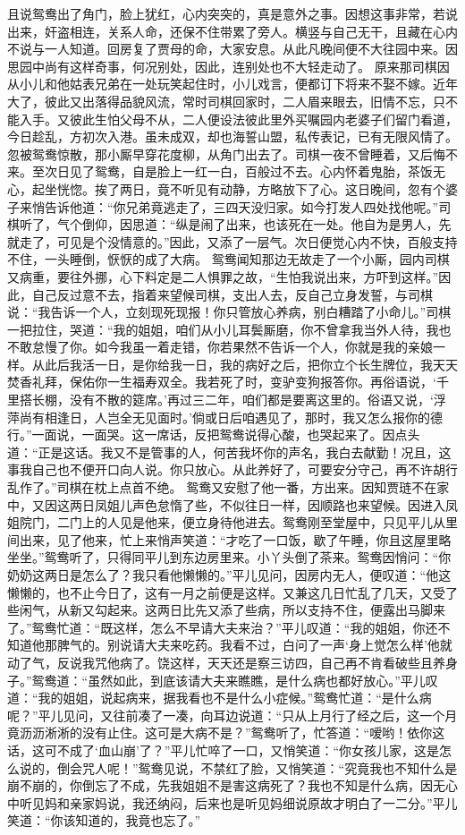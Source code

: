 \documentclass[12pt,oneside]{book}
\begin{document}
且说鸳鸯出了角门，脸上犹红，心内突突的，真是意外之事。因想这事非常，若说出来，奸盗相连，关系人命，还保不住带累了旁人。横竖与自己无干，且藏在心内不说与一人知道。回房复了贾母的命，大家安息。从此凡晚间便不大往园中来。因思园中尚有这样奇事，何况别处，因此，连别处也不大轻走动了。
原来那司棋因从小儿和他姑表兄弟在一处玩笑起住时，小儿戏言，便都订下将来不娶不嫁。近年大了，彼此又出落得品貌风流，常时司棋回家时，二人眉来眼去，旧情不忘，只不能入手。又彼此生怕父母不从，二人便设法彼此里外买嘱园内老婆子们留门看道，今日趁乱，方初次入港。虽未成双，却也海誓山盟，私传表记，已有无限风情了。忽被鸳鸯惊散，那小厮早穿花度柳，从角门出去了。司棋一夜不曾睡着，又后悔不来。至次日见了鸳鸯，自是脸上一红一白，百般过不去。心内怀着鬼胎，茶饭无心，起坐恍惚。挨了两日，竟不听见有动静，方略放下了心。这日晚间，忽有个婆子来悄告诉他道：“你兄弟竟逃走了，三四天没归家。如今打发人四处找他呢。”司棋听了，气个倒仰，因思道：“纵是闹了出来，也该死在一处。他自为是男人，先就走了，可见是个没情意的。”因此，又添了一层气。次日便觉心内不快，百般支持不住，一头睡倒，恹恹的成了大病。
鸳鸯闻知那边无故走了一个小厮，园内司棋又病重，要往外挪，心下料定是二人惧罪之故，“生怕我说出来，方吓到这样。”因此，自己反过意不去，指着来望候司棋，支出人去，反自己立身发誓，与司棋说：“我告诉一个人，立刻现死现报！你只管放心养病，别白糟踏了小命儿。”司棋一把拉住，哭道：“我的姐姐，咱们从小儿耳鬓厮磨，你不曾拿我当外人待，我也不敢怠慢了你。如今我虽一着走错，你若果然不告诉一个人，你就是我的亲娘一样。从此后我活一日，是你给我一日，我的病好之后，把你立个长生牌位，我天天焚香礼拜，保佑你一生福寿双全。我若死了时，变驴变狗报答你。再俗语说，‘千里搭长棚，没有不散的筵席。’再过三二年，咱们都是要离这里的。俗语又说，‘浮萍尚有相逢日，人岂全无见面时。’倘或日后咱遇见了，那时，我又怎么报你的德行。”一面说，一面哭。这一席话，反把鸳鸯说得心酸，也哭起来了。因点头道：“正是这话。我又不是管事的人，何苦我坏你的声名，我白去献勤！况且，这事我自己也不便开口向人说。你只放心。从此养好了，可要安分守己，再不许胡行乱作了。”司棋在枕上点首不绝。
鸳鸯又安慰了他一番，方出来。因知贾琏不在家中，又因这两日凤姐儿声色怠惰了些，不似往日一样，因顺路也来望候。因进入凤姐院门，二门上的人见是他来，便立身待他进去。鸳鸯刚至堂屋中，只见平儿从里间出来，见了他来，忙上来悄声笑道：“才吃了一口饭，歇了午睡，你且这屋里略坐坐。”鸳鸯听了，只得同平儿到东边房里来。小丫头倒了茶来。鸳鸯因悄问：“你奶奶这两日是怎么了？我只看他懒懒的。”平儿见问，因房内无人，便叹道：“他这懒懒的，也不止今日了，这有一月之前便是这样。又兼这几日忙乱了几天，又受了些闲气，从新又勾起来。这两日比先又添了些病，所以支持不住，便露出马脚来了。”鸳鸯忙道：“既这样，怎么不早请大夫来治？”平儿叹道：“我的姐姐，你还不知道他那脾气的。别说请大夫来吃药。我看不过，白问了一声‘身上觉怎么样’他就动了气，反说我咒他病了。饶这样，天天还是察三访四，自己再不肯看破些且养身子。”鸳鸯道：“虽然如此，到底该请大夫来瞧瞧，是什么病也都好放心。”平儿叹道：“我的姐姐，说起病来，据我看也不是什么小症候。”鸳鸯忙道：“是什么病呢？”平儿见问，又往前凑了一凑，向耳边说道：“只从上月行了经之后，这一个月竟沥沥淅淅的没有止住。这可是大病不是？”鸳鸯听了，忙答道：“嗳哟！依你这话，这可不成了‘血山崩’了？”平儿忙啐了一口，又悄笑道：“你女孩儿家，这是怎么说的，倒会咒人呢！”鸳鸯见说，不禁红了脸，又悄笑道：“究竟我也不知什么是崩不崩的，你倒忘了不成，先我姐姐不是害这病死了？我也不知是什么病，因无心中听见妈和亲家妈说，我还纳闷，后来也是听见妈细说原故才明白了一二分。”平儿笑道：“你该知道的，我竟也忘了。”
\end{document}
